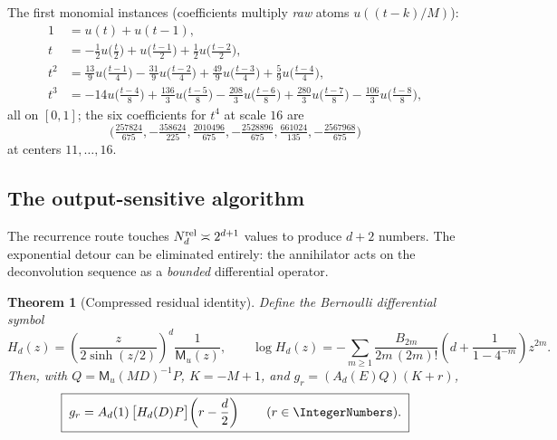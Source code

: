 \documentclass[11pt,oneside]{article}
\numberwithin{equation}{section}
\newtheorem{theorem}{Theorem}[section]
\theoremstyle{definition}
\theoremstyle{remark}
\newcommand{\MM}{\mathsf M}
\begin{document}
The first monomial instances (coefficients multiply \emph{raw} atoms
$u((t-k)/M)$):
\begin{align}
 1&=u(t)+u(t-1),\\
 t&=-\tfrac12u\bigl(\tfrac t2\bigr)
 +u\bigl(\tfrac{t-1}2\bigr)
 +\tfrac12u\bigl(\tfrac{t-2}2\bigr),\\
 t^{2}&=\tfrac{13}9u\bigl(\tfrac{t-1}4\bigr)
 -\tfrac{31}9u\bigl(\tfrac{t-2}4\bigr)
 +\tfrac{49}9u\bigl(\tfrac{t-3}4\bigr)
 +\tfrac59u\bigl(\tfrac{t-4}4\bigr),\\
 t^{3}&=-14u\bigl(\tfrac{t-4}8\bigr)
 +\tfrac{136}3u\bigl(\tfrac{t-5}8\bigr)
 -\tfrac{208}3u\bigl(\tfrac{t-6}8\bigr)
 +\tfrac{280}3u\bigl(\tfrac{t-7}8\bigr)
 -\tfrac{106}3u\bigl(\tfrac{t-8}8\bigr),
 \label{eq:monomial-examples}
\end{align}
all on $[0,1]$; the six coefficients for $t^{4}$ at scale $16$ are
\[
\bigl(\tfrac{257824}{675},-\tfrac{358624}{225},
\tfrac{2010496}{675},-\tfrac{2528896}{675},
\tfrac{661024}{135},-\tfrac{2567968}{675}\bigr)
\]
at centers
$11,\dots,16$.

\subsection{The output-sensitive algorithm}
\label{sec:fast}

The recurrence route touches $N_d^{\rm rel}\asymp2^{d+1}$ values to produce
$d+2$ numbers.  The exponential detour can be eliminated entirely: the
annihilator acts on the deconvolution sequence as a \emph{bounded}
differential operator.

\begin{theorem}[Compressed residual identity]
\label{thm:H-identity}
Define the Bernoulli differential symbol
\begin{equation}
 H_d(z)=\left(\frac{z}{2\sinh(z/2)}\right)^{\!d}\frac{1}{\MM_u(z)},
 \qquad
 \log H_d(z)=
 -\sum_{m\ge1}\frac{B_{2m}}{2m\,(2m)!}
 \left(d+\frac{1}{1-4^{-m}}\right)z^{2m}.
 \label{eq:H-def}
\end{equation}
Then, with $Q=\MM_u(MD)^{-1}P$, $K=-M+1$, and
$g_r=(A_d(E)Q)(K+r)$,
\begin{equation}
 \boxed{\;
 g_r=A_d(1)\,\bigl[H_d(D)P\bigr]\!\left(r-\frac d2\right)
 \qquad(r\in\IntegerNumbers).
 \;}
 \label{eq:g-fast}
\end{equation}
\end{theorem}
\end{document}
